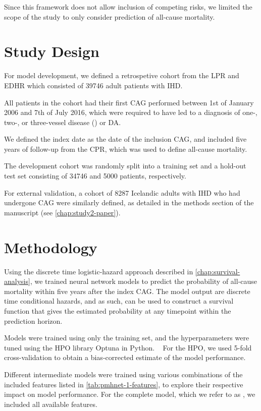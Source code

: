 Since this framework does not allow inclusion of competing risks,
we limited the scope of the study to only consider prediction
of all-cause mortality.

\section{Study Design}

For model development, we defined a retrospetive cohort from the \ac{LPR}
and \ac{EDHR} which consisted of \num{39746} adult patients with \ac{IHD}.

All patients in the cohort had their first \ac{CAG} performed between
1st of January 2006 and 7th of July 2016, which were required to 
have led to a diagnosis of one-, two-, or three-vessel disease 
() or \ac{DA}.

We defined the index date as the date of the inclusion \ac{CAG}, and 
included five years of follow-up from the \ac{CPR}, which was used
to define all-cause mortality.

The development cohort was randomly split into a training set 
and a hold-out test set consisting of 
\num{34746} and \num{5000} patients, respectively.

For external validation, a cohort of \num{8287} Icelandic adults 
with \ac{IHD} who had undergone \ac{CAG} were similarly defined,
as detailed in the methods section of the manuscript 
(see \cref{chap:study2-paper}).

\section{Methodology}

Using the discrete time logistic-hazard approach described in 
\cref{chap:survival-analysis}, we trained neural network models
to predict the probability of all-cause mortality within five years
after the index \ac{CAG}.
The model output are discrete time conditional hazards, 
and as such, can be used to construct a survival function that
gives the estimated probability at any timepoint within the
prediction horizon.

Models were trained using only the training set, and the hyperparameters
were tuned using the \ac{HPO} library Optuna in Python.
~\autocite{akibaOptuna2019}
For the \ac{HPO}, we used 5-fold cross-validation to obtain a bias-corrected
estimate of the model performance.

Different intermediate models were trained using various combinations
of the included features listed in \cref{tab:pmhnet-1-features},
to explore their respective impact on model performance.
For the complete model, which we refer to as , we included
all available features.

